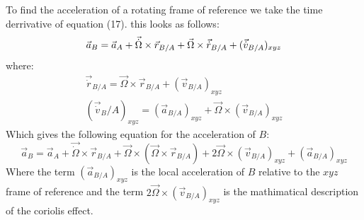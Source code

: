 \documentclass[11pt, a4paper]{article}
\begin{document}
To find the acceleration of a rotating frame of reference we take the time derrivative of equation (17). this looks as follows:
\begin{equation}
  \vec{a}_B = \vec{a}_A + \vec{\dot{\Omega}} \times \vec{r}_{B/A} + \vec{\Omega} \times \vec{\dot{r}}_{B/A} + (\vec{\dot{v}}_{B/A})_{xyz}\\
\end{equation}
where:
\begin{gather*}
  \vec{\dot{r}}_{B/A} = \vec{\Omega} \times \vec{r}_{B/A} + (\vec{v}_{B/A})_{xyz}\\
  (\vec{\dot{v}}_B/A)_{xyz} = (\vec{a}_{B/A})_{xyz} + \vec{\Omega} \times (\vec{v}_{B/A})_{xyz}
\end{gather*}
Which gives the following equation for the acceleration of $B$:
\begin{equation}
  \vec{a}_B = \vec{a}_A + \vec{\dot{\Omega}} \times \vec{r}_{B/A} + \vec{\Omega} \times (\vec{\Omega} \times \vec{r}_{B/A}) + 2\vec{\Omega} \times (\vec{v}_{B/A})_{xyz} + (\vec{a}_{B/A})_{xyz}
\end{equation}
Where the term $(\vec{a}_{B/A})_{xyz}$ is the local acceleration of $B$ relative to the $xyz$ frame of reference and the term $2\vec{\Omega} \times (\vec{v}_{B/A})_{xyz}$ is the mathimatical description of the coriolis effect.
\end{document}
